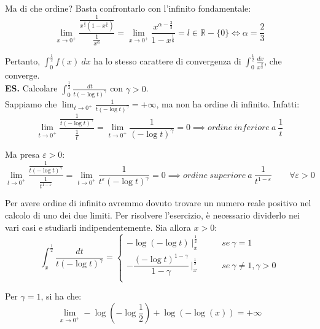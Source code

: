 \documentclass{article}
\begin{document}
\noindent Ma di che ordine? Basta confrontarlo con l'infinito fondamentale:
\begin{equation*}
    \lim_{x \to 0^+} \frac{\frac{1}{x^{\frac{2}{3}} (1 - x^{\frac{1}{6}})}}{\frac{1}{x^\alpha}} = \lim_{x \to 0^+} \frac{x^{\alpha - \frac{2}{3}}}{1 - x^{\frac{1}{6}}} = l \in \mathbb{R} - \{0\} \iff \alpha = \frac{2}{3}
\end{equation*}

\noindent Pertanto, $\int_0^{\frac{1}{2}} f(x) \ dx$ ha lo stesso carattere di convergenza di $\int_0^{\frac{1}{2}} \frac{dx}{x^{\frac{2}{3}}}$, che converge.\\

\noindent\textbf{ES.} Calcolare $\int_0^\frac{1}{2} \frac{dt}{t(-\log t)^{\gamma}}$ con $\gamma > 0$.\\
\noindent Sappiamo che $\lim_{t \to 0^+} \frac{1}{{t(-\log t)^{\gamma}}} = +\infty$, ma non ha ordine di infinito. Infatti:
\begin{equation*}
    \lim_{t \to 0^+} \frac{\frac{1}{{t(-\log t)^{\gamma}}}}{\frac{1}{t}} = \lim_{t \to 0^+} \frac{1}{{(-\log t)^{\gamma}}} = 0 \implies ordine \ inferiore \ a \ \frac{1}{t}
\end{equation*}

\noindent Ma presa $\varepsilon > 0$:
\begin{equation*}
    \lim_{t \to 0^+} \frac{\frac{1}{{t(-\log t)^{\gamma}}}}{\frac{1}{t^{1 - \varepsilon}}} = \lim_{t \to 0^+} \frac{1}{{t^\varepsilon(-\log t)^{\gamma}}} = 0 \implies ordine \ superiore \ a \ \frac{1}{t^{1 - \varepsilon}} \qquad \forall \varepsilon > 0
\end{equation*}

\noindent Per avere ordine di infinito avremmo dovuto trovare un numero reale positivo nel calcolo di uno dei due limiti. Per risolvere l'esercizio, è necessario dividerlo nei vari casi e studiarli indipendentemente. Sia allora $x > 0$:
\begin{equation*}
    \int_x^\frac{1}{2} \frac{dt}{t(-\log t)^\gamma} = \begin{cases}
        -\log(-\log t) \ \bigg|_x^\frac{1}{2} & \qquad se \ \gamma = 1 \\
        - \dfrac{(-\log t)^{1 - \gamma}}{1 - \gamma} \ \bigg|_x^\frac{1}{2} & \qquad se \ \gamma \neq 1, \gamma > 0 \\
    \end{cases}
\end{equation*}

\noindent Per $\gamma = 1$, si ha che:
\begin{equation*}
    \lim_{x \to 0^+} -\log\left(-\log\frac{1}{2}\right) + \log(-\log(x)) = +\infty
\end{equation*}
\end{document}

